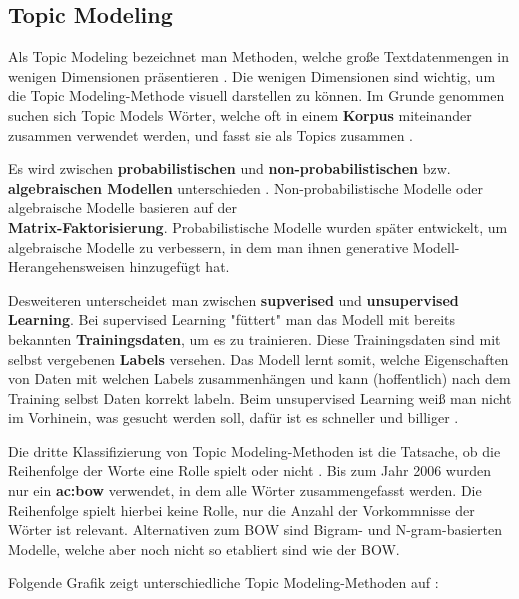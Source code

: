\subsection{Topic Modeling} \label{sec:topciModeling}

Als Topic Modeling bezeichnet man Methoden, welche große Textdatenmengen in wenigen Dimensionen präsentieren \cite[3]{Kherwa2020}. Die wenigen Dimensionen sind wichtig, um die Topic Modeling-Methode visuell darstellen zu können. Im Grunde genommen suchen sich Topic Models Wörter, welche oft in einem \textbf{Korpus} miteinander zusammen verwendet werden, und fasst sie als Topics zusammen \cite{sense-topic-modelling-van-kessel}.

Es wird zwischen \textbf{probabilistischen} und \textbf{non-probabilistischen} bzw. \textbf{algebraischen Modellen} unterschieden \cite[3]{Kherwa2020}. Non-probabilistische Modelle oder algebraische Modelle basieren auf der \\\textbf{Matrix-Faktorisierung}. Probabilistische Modelle wurden später entwickelt, um algebraische Modelle zu verbessern, in dem man ihnen generative Modell-Herangehensweisen hinzugefügt hat.

Desweiteren unterscheidet man zwischen \textbf{supverised} und \textbf{unsupervised Learning}. Bei supervised Learning "füttert" man das Modell mit bereits bekannten \textbf{Trainingsdaten}, um es zu trainieren. \cite[186]{Plaue2021} Diese Trainingsdaten sind mit selbst vergebenen \textbf{Labels} versehen. Das Modell lernt somit, welche Eigenschaften von Daten mit welchen Labels zusammenhängen und kann (hoffentlich) nach dem Training selbst Daten korrekt labeln. Beim unsupervised Learning weiß man nicht im Vorhinein, was gesucht werden soll, dafür ist es schneller und billiger \cite{sense-topic-modelling-van-kessel}.

Die dritte Klassifizierung von Topic Modeling-Methoden ist die Tatsache, ob die Reihenfolge der Worte eine Rolle spielt oder nicht \cite[3]{Kherwa2020}. Bis zum Jahr 2006 wurden nur ein \textbf{\acrfull{ac:bow}} verwendet, in dem alle Wörter zusammengefasst werden. Die Reihenfolge spielt hierbei keine Rolle, nur die Anzahl der Vorkommnisse der Wörter ist relevant. Alternativen zum BOW sind Bigram- und N-gram-basierten Modelle, welche aber noch nicht so etabliert sind wie der BOW.

Folgende Grafik zeigt unterschiedliche Topic Modeling-Methoden auf \cite[3]{Kherwa2020}:

